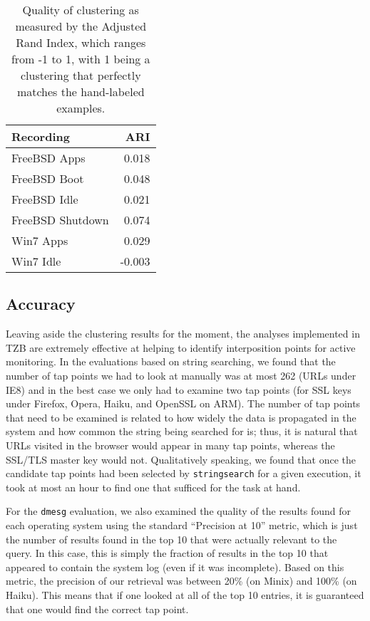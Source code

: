 \begin{table}
    \centering
    \small
    \begin{tabular}{|l|r|}
        \hline
        Recording & ARI \\
        \hline
        FreeBSD Apps & 0.018 \\
        FreeBSD Boot & 0.048 \\
        FreeBSD Idle & 0.021 \\
        FreeBSD Shutdown & 0.074 \\
        Win7 Apps & 0.029 \\
        Win7 Idle & -0.003 \\
        \hline
    \end{tabular}
\caption{Quality of clustering as measured by the Adjusted Rand Index,
which ranges from -1 to 1, with 1 being a clustering that perfectly
matches the hand-labeled examples.}
\label{tbl:clustqual}
\end{table}

\subsection{Accuracy}
\label{sec:eval:subsec:accuracy}

Leaving aside the clustering results for the moment, the analyses
implemented in TZB are extremely effective at helping to identify
interposition points for active monitoring. In the evaluations based on
string searching, we found that the number of tap points we had to look
at manually was at most 262 (URLs under IE8) and in the best case we
only had to examine two tap points (for SSL keys under Firefox, Opera,
Haiku, and OpenSSL on ARM). The number of tap points that need to be
examined is related to how widely the data is propagated in the system
and how common the string being searched for is; thus, it is natural
that URLs visited in the browser would appear in many tap points,
whereas the SSL/TLS master key would not. Qualitatively speaking, we
found that once the candidate tap points had been selected by
\texttt{stringsearch} for a given execution, it took at most an hour to
find one that sufficed for the task at hand.

For the \texttt{dmesg} evaluation, we also examined the quality of the
results found for each operating system using the standard ``Precision
at 10'' metric, which is just the number of results found in the top 10
that were actually relevant to the query. In this case, this is simply
the fraction of results in the top 10 that appeared to contain the
system log (even if it was incomplete). Based on this metric, the
precision of our retrieval was between 20\% (on Minix) and 100\% (on
Haiku). This means that if one looked at all of the top 10 entries, it
is guaranteed that one would find the correct tap point.

